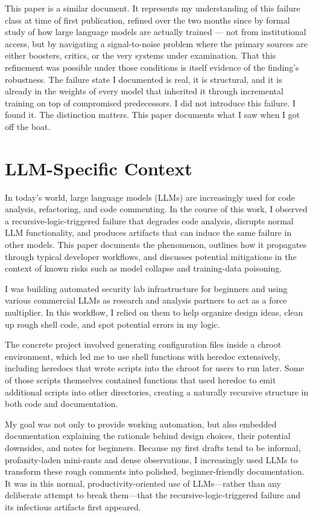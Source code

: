 \documentclass[11pt]{article}
\begin{document}
This paper is a similar document. It represents my understanding of this failure class at time of first publication, refined over the two months since by formal study of how large language models are actually trained — not from institutional access, but by navigating a signal-to-noise problem where the primary sources are either boosters, critics, or the very systems under examination. That this refinement was possible under those conditions is itself evidence of the finding's robustness. The failure state I documented is real, it is structural, and it is already in the weights of every model that inherited it through incremental training on top of compromised predecessors.
I did not introduce this failure. I found it. The distinction matters.
This paper documents what I saw when I got off the boat.

\section{LLM-Specific Context}
In today’s world, large language models (LLMs) are increasingly used for code analysis, refactoring, and code commenting.\cite{qiu2025} In the course of this work, I observed a recursive-logic-triggered failure that degrades code analysis, disrupts normal LLM functionality, and produces artifacts that can induce the same failure in other models.\cite{shumailov2023a,shumailov2023b} This paper documents the phenomenon, outlines how it propagates through typical developer workflows, and discusses potential mitigations in the context of known risks such as model collapse and training-data poisoning.\cite{shumailov2023a,bommasani2024,owasp2025}

I was building automated security lab infrastructure for beginners and using various commercial LLMs as research and analysis partners to act as a force multiplier.\cite{qiu2025} In this workflow, I relied on them to help organize design ideas, clean up rough shell code, and spot potential errors in my logic.

The concrete project involved generating configuration files inside a chroot environment, which led me to use shell functions with heredoc extensively, including heredocs that wrote scripts into the chroot for users to run later. Some of those scripts themselves contained functions that used heredoc to emit additional scripts into other directories, creating a naturally recursive structure in both code and documentation.

My goal was not only to provide working automation, but also embedded documentation explaining the rationale behind design choices, their potential downsides, and notes for beginners. Because my first drafts tend to be informal, profanity-laden mini-rants and dense observations, I increasingly used LLMs to transform these rough comments into polished, beginner-friendly documentation.\cite{qiu2025} It was in this normal, productivity-oriented use of LLMs—rather than any deliberate attempt to break them—that the recursive-logic-triggered failure and its infectious artifacts first appeared.\cite{shumailov2023b}
\end{document}
